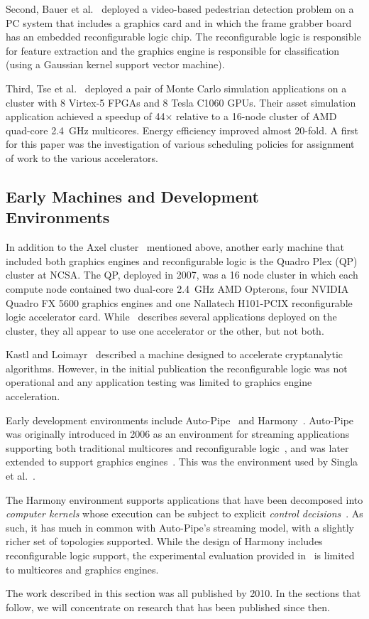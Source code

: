 Second, Bauer et al.~\cite{bkdb10} deployed a video-based pedestrian
detection problem on a PC system that includes a graphics card and
in which the frame grabber board has an embedded reconfigurable logic chip.
The reconfigurable logic is responsible for feature extraction and the
graphics engine is responsible for classification (using a Gaussian
kernel support vector machine).

Third, Tse et al.~\cite{tttl10} deployed a pair of Monte Carlo simulation
applications on a cluster with 8 Virtex-5 FPGAs and 8 Tesla C1060 GPUs.
Their asset simulation application achieved a speedup of 44$\times$ relative
to a 16-node cluster of AMD quad-core 2.4~GHz multicores.  Energy efficiency
improved almost 20-fold.
A first for this paper was the investigation of various scheduling policies
for assignment of work to the various accelerators.

\subsection{Early Machines and Development Environments}
\label{sec:em}

In addition to the Axel cluster~\cite{tl10} mentioned above, another
early machine that included both graphics engines and reconfigurable
logic is the Quadro Plex (QP)~\cite{sep+09} cluster at NCSA.
The QP, deployed in 2007,
was a 16 node cluster in which each compute node contained two
dual-core 2.4~GHz AMD Opterons, four NVIDIA Quadro FX 5600 graphics
engines and one Nallatech H101-PCIX reconfigurable logic accelerator card.
While~\cite{sep+09} describes several applications deployed on the cluster,
they all appear to use one accelerator or the other, but not both.

Kastl and Loimayr~\cite{kl10} described a machine designed to accelerate
cryptanalytic algorithms.  However, in the initial publication the
reconfigurable logic was not operational and any application testing
was limited to graphics engine acceleration.

Early development environments include Auto-Pipe~\cite{ftb+06,cft+10}
and Harmony~\cite{dy08}.  Auto-Pipe was originally introduced in 2006
as an environment for streaming applications supporting both traditional
multicores and reconfigurable logic~\cite{ftb+06}, and was later extended
to support graphics engines~\cite{cft+10}. This was the environment
used by Singla et al.~\cite{shsc08}.

The Harmony environment supports applications that have been decomposed into
\emph{computer kernels} whose execution can be subject to explicit
\emph{control decisions}~\cite{dy08}.
As such, it has much in common with Auto-Pipe's
streaming model, with a slightly richer set of topologies supported.
While the design of Harmony includes reconfigurable logic support, the
experimental evaluation provided in~\cite{dy08} is limited to multicores
and graphics engines.

The work described in this section was all published by 2010. In the
sections that follow, we will concentrate on research that has been
published since then.
